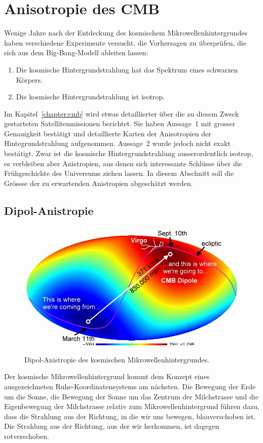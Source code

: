 \section{Anisotropie des CMB}
Wenige Jahre nach der Entdeckung des kosmischem Mikrowellenhintergrundes
haben verschiedene Experimente versucht, die Vorhersagen zu überprüfen,
die sich aus dem Big-Bang-Modell ableiten lassen:
\begin{enumerate}
\item Die kosmische Hintergrundstrahlung hat das Spektrum eines schwarzen
Körpers.
\item Die kosmische Hintergrundstrahlung ist isotrop.
\end{enumerate}
Im Kapitel~\ref{chapter:cmb} wird etwas detaillierter über die zu diesem
Zweck gestarteten Satellitenmissionen berichtet.
Sie haben Aussage~1 mit grosser Genauigkeit bestätigt und detaillierte
Karten der Anisotropien der Hintegrundstrahlung aufgenommen.
Aussage~2 wurde jedoch nicht exakt bestätigt.
Zwar ist die kosmische Hintergrundstrahlung ausserordentlich isotrop,
es verbleiben aber Anistropien, aus denen sich interessante Schlüsse
über die Frühgeschichte des Universums ziehen lassen.
In diesem Abschnitt soll die Grössse der zu erwartenden Anistropien
abgeschätzt werden.

\subsection{Dipol-Anistropie%
\label{section:cmb:dipolaniso}}
\begin{figure}
\centering
\includegraphics[width=0.8\hsize]{chapters/images/CMBdipole.jpg}
\caption{Dipol-Anistropie des kosmischen Mikrowellenhintergrundes.
\label{skript:cmb:dipolaniso}}
\end{figure}
Der kosmische Mikrowellenhintergrund kommt dem Konzept eines ausgezeichneten
Ruhe-Koor\-di\-na\-ten\-systems am nächsten.
Die Bewegung der Erde um die Sonne, die Bewegung der Sonne um das Zentrum
der Milchstrasse und die Eigenbewegung der Milchstrasse relativ zum
Mikrowellenhintergrund führen dazu, dass die Strahlung aus der Richtung,
in die wir uns bewegen, blauverschoben ist.
Die Strahlung aus der Richtung, aus der wir herkommen, ist dagegen
rotverschoben.

